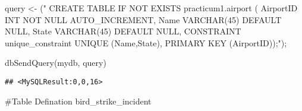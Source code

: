 \documentclass[
]{article}
\newenvironment{Shaded}{\begin{snugshade}}{\end{snugshade}}
\newcommand{\FunctionTok}[1]{\textcolor[rgb]{0.00,0.00,0.00}{#1}}
\newcommand{\NormalTok}[1]{#1}
\newcommand{\OtherTok}[1]{\textcolor[rgb]{0.56,0.35,0.01}{#1}}
\newcommand{\StringTok}[1]{\textcolor[rgb]{0.31,0.60,0.02}{#1}}
\begin{document}
\begin{Shaded}
\begin{Highlighting}[]
\NormalTok{query }\OtherTok{\textless{}{-}}\NormalTok{ (}\StringTok{"}
\StringTok{  CREATE TABLE IF NOT EXISTS practicum1.\textasciigrave{}airport\textasciigrave{} (}
\StringTok{  \textasciigrave{}AirportID\textasciigrave{} INT NOT NULL AUTO\_INCREMENT,}
\StringTok{  \textasciigrave{}Name\textasciigrave{} VARCHAR(45) DEFAULT \textquotesingle{} \textquotesingle{} NULL,}
\StringTok{  \textasciigrave{}State\textasciigrave{} VARCHAR(45) DEFAULT \textquotesingle{} \textquotesingle{} NULL,}
\StringTok{  CONSTRAINT unique\_constraint UNIQUE (Name,State),}
\StringTok{  PRIMARY KEY (\textasciigrave{}AirportID\textasciigrave{}));"}\NormalTok{);}

\FunctionTok{dbSendQuery}\NormalTok{(mydb, query)}
\end{Highlighting}
\end{Shaded}

\begin{verbatim}
## <MySQLResult:0,0,16>
\end{verbatim}

\#Table Defination bird\_strike\_incident
\end{document}
